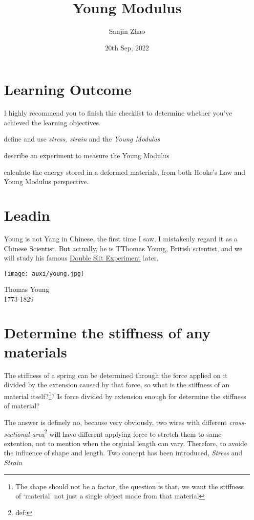 \documentclass[a4paper]{tufte-handout}
\title{Young Modulus}
\author{Sanjin Zhao}
\date{20th Sep, 2022}  %
\begin{document}
\maketitle%
\section*{Learning Outcome}
I highly recommend you to finish this checklist to determine whether you've achieved the learning objectives.
\begin{todolist}
  \item define and use \emph{stress, strain} and the \emph{Young Modulus}
  \item describe an experiment to measure the Young Modulus
  \item calculate the energy stored in a deformed materials, from both Hooke's Law and Young Modulus perspective.
\end{todolist}
\clearpage

\section{Leadin}
Young is not Yang in Chinese, the first time I saw, I mistakenly regard it as a Chinese Scientist. But actually, he is TThomas Young, British scientist, and we will study his famous \href{https://www.britannica.com/biography/Thomas-Young}{Double Slit Experiment} later.
\begin{marginfigure}
\texttt{[image: auxi/young.jpg]}
\caption{Thomas Young\\1773-1829}
\end{marginfigure}

\section{Determine the stiffness of any materials}
The stiffness of a spring can be determined through the force applied on it divided by the extension caused by that force, so what is the stiffness of an material itself?\footnote{The shape should not be a factor, the question is that, we want the stiffness of `material' not just a single object made from that material}? Is force divided by extension enough for determine the stiffness of material?

The answer is definely no, because very obviously, two wires with different \emph{cross-sectional area}\footnote{def:} will have different applying force to stretch them to same extention, not to mention when the orginial length can vary. Therefore, to avoide the influence of shape and length. Two concept has been introduced, \emph{Stress} and \emph{Strain}
\end{document}
